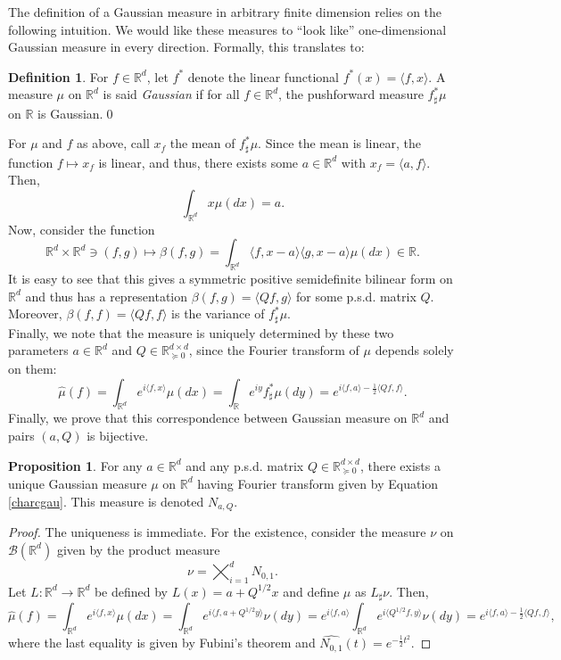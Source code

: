 \documentclass[10pt, a4paper]{report}
\newcommand{\R}[0]{\mathbb{R}}
\theoremstyle{definition}
\newtheorem{prop}{Proposition}
\newtheorem{definition}{Definition}
\theoremstyle{remark}
\begin{document}
The definition of a Gaussian measure in arbitrary finite dimension relies on the following intuition. We would like these measures to ``look like'' one-dimensional Gaussian measure in every direction. Formally, this translates to:
\begin{definition}
	For $f \in \R^d$, let $f^*$ denote the linear functional $f^*(x)=\langle f,x\rangle$. A measure $\mu$ on $\R^d$ is said \emph{Gaussian} if for all $f \in \R^d$, the pushforward  measure $f^*_{\sharp}\mu$ on $\R$ is Gaussian.\qed
\end{definition}
For $\mu$ and $f$ as above, call $x_f$ the mean of $f^*_{\sharp}\mu$. Since the mean is linear, the function $f\mapsto x_f$ is linear, and thus, there exists some $a \in \R^d$  with $x_f = \langle a,f\rangle$. Then, 
$$\int_{\R^d} x \mu(dx) =  a.$$
Now, consider the function
$$\R^d \times \R^d \ni (f,g) \mapsto \beta(f,g) = \int_{\R^d} \langle f,x-a\rangle \langle g,x-a\rangle \mu(dx) \in \R. $$
It is easy to see that this gives a symmetric positive semidefinite bilinear form on $\R^d$ and thus has a representation $\beta(f,g)=\langle Qf,g\rangle$ for some p.s.d. matrix $Q$. Moreover, $\beta(f,f)=\langle Qf,f\rangle$ is the variance of $f^*_{\sharp}\mu$. \\
Finally, we note that the measure is uniquely determined by these two parameters $a\in \R^d$ and $Q \in \R^{d \times d}_{\succeq 0}$, since the Fourier transform of $\mu$ depends solely on them:
\begin{equation}\label{charcgau}
	\widehat{\mu}(f) = \int_{\R^d}e^{i\langle f,x\rangle}\mu(dx) = \int_{\R} e^{iy} f^*_{\sharp}\mu(dy) = e^{i\langle f,a\rangle - \frac{1}{2} \langle Qf,f\rangle }.
\end{equation}
Finally, we prove that this correspondence between Gaussian measure on $\R^d$ and pairs $(a,Q)$ is bijective. 
\begin{prop}\label{uniquegaussfin}
	For any $a \in \R^d$ and any p.s.d. matrix $Q \in \R^{d \times d}_{\succeq 0}$, there exists a unique Gaussian measure $\mu$ on $\R^d$ having Fourier transform given by Equation \ref{charcgau}. This measure is denoted $N_{a,Q}$.
	\begin{proof}
		The uniqueness is immediate. For the existence, consider the measure $\nu$ on $\mathcal{B}(\R^d)$ given by the product measure $$\nu = \bigtimes_{i=1}^d N_{0,1}.$$ Let $L:\R^d \to \R^d$ be defined by $L(x)= a + Q^{1/2} x$ and define $\mu$ as $L_{\sharp}\nu$. Then,
		$$\widehat{\mu}(f) = \int_{\R^d}e^{i\langle f,x\rangle}\mu(dx) = \int_{\R^d} e^{i\langle f,a+Q^{1/2}y\rangle} \nu(dy) = e^{i\langle f,a\rangle} \int_{\R^d} e^{i\langle Q^{1/2}f,y\rangle} \nu(dy) = e^{i\langle f,a\rangle - \frac{1}{2} \langle Qf,f\rangle },$$
		where the last equality is given by Fubini's theorem and $\widehat{N_{0,1}}(t)= e^{-\frac{1}{2}t^2}$.	
	\end{proof}
\end{prop} 
\end{document}
